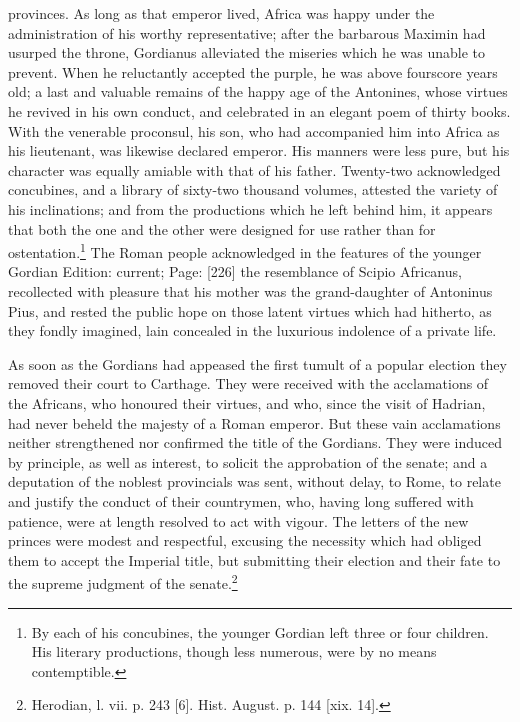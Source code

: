 provinces. As long as that emperor lived, Africa was happy under the administration of his worthy representative; after the barbarous Maximin had usurped the throne, Gordianus alleviated the miseries which he was unable to prevent. When he reluctantly accepted the purple, he was above fourscore years old; a last and valuable remains of the happy age of the Antonines, whose virtues he revived in his own conduct, and celebrated in an elegant poem of thirty books. With the venerable proconsul, his son, who had accompanied him into Africa as his lieutenant, was likewise declared emperor. His manners were less pure, but his character was equally amiable with that of his father. Twenty-two acknowledged concubines, and a library of sixty-two thousand volumes, attested the variety of his inclinations; and from the productions which he left behind him, it appears that both the one and the other were designed for use rather than for ostentation.\footnote{By each of his concubines, the younger Gordian left three or four children. His literary productions, though less numerous, were by no means contemptible.} The Roman people acknowledged in the features of the younger Gordian Edition: current; Page: [226] the resemblance of Scipio Africanus, recollected with pleasure that his mother was the grand-daughter of Antoninus Pius, and rested the public hope on those latent virtues which had hitherto, as they fondly imagined, lain concealed in the luxurious indolence of a private life.

As soon as the Gordians had appeased the first tumult of a popular election they removed their court to Carthage. They were received with the acclamations of the Africans, who honoured their virtues, and who, since the visit of Hadrian, had never beheld the majesty of a Roman emperor. But these vain acclamations neither strengthened nor confirmed the title of the Gordians. They were induced by principle, as well as interest, to solicit the approbation of the senate; and a deputation of the noblest provincials was sent, without delay, to Rome, to relate and justify the conduct of their countrymen, who, having long suffered with patience, were at length resolved to act with vigour. The letters of the new princes were modest and respectful, excusing the necessity which had obliged them to accept the Imperial title, but submitting their election and their fate to the supreme judgment of the senate.\footnote{Herodian, l. vii. p. 243 [6]. Hist. August. p. 144 [xix. 14].}

